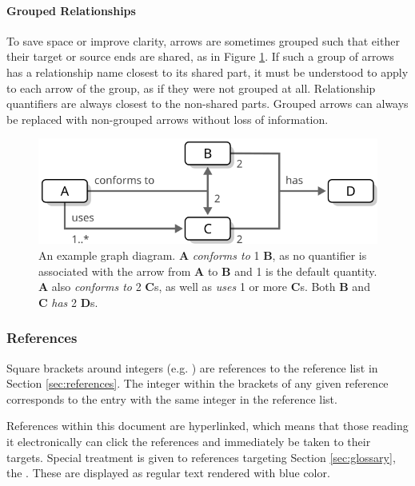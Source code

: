 \paragraph{Grouped Relationships}
To save space or improve clarity, arrows are sometimes grouped such that either their target or source ends are shared, as in Figure \ref{fig:graph-diagram}.
If such a group of arrows has a relationship name closest to its shared part, it must be understood to apply to each arrow of the group, as if they were not grouped at all.
Relationship quantifiers are always closest to the non-shared parts.
Grouped arrows can always be replaced with non-grouped arrows without loss of information.

\vfill

\begin{figure}[ht!]
  \centering
  \includegraphics[scale=0.9]{figures/graph-diagram}
  \caption{
    An example graph diagram.
    \textbf{A} \textit{conforms to} 1 \textbf{B}, as no quantifier is associated with the arrow from \textbf{A} to \textbf{B} and 1 is the default quantity.
    \textbf{A} also \textit{conforms to} 2 \textbf{C}s, as well as \textit{uses} 1 or more \textbf{C}s.
    Both \textbf{B} and \textbf{C} \textit{has} 2 \textbf{D}s.
  }
  \label{fig:graph-diagram}
\end{figure}

\subsubsection{References}

Square brackets around integers (e.g. \cite{delsing2017iot}) are references to the reference list in Section \ref{sec:references}.
The integer within the brackets of any given reference corresponds to the entry with the same integer in the reference list.

References within this document are hyperlinked, which means that those reading it electronically can click the references and immediately be taken to their targets.
Special treatment is given to references targeting Section \ref{sec:glossary}, the .
These are displayed as regular text rendered with blue color.

